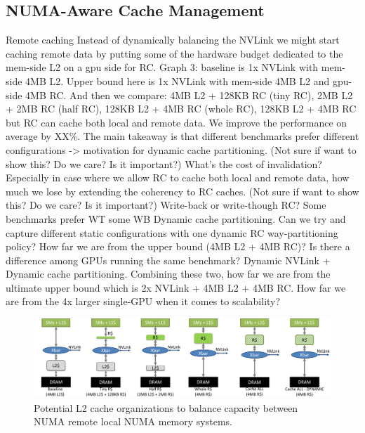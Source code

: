 \subsection{NUMA-Aware Cache Management}
\label{caching}
Remote caching
Instead of dynamically balancing the NVLink we might start caching remote data 
by putting some of the hardware budget dedicated to the mem-side L2 on a gpu 
side for RC. 
Graph 3: baseline is 1x NVLink with mem-side 4MB L2. Upper bound here is 1x 
NVLink with mem-side 4MB L2 and gpu-side 4MB RC. And then we compare: 4MB L2 + 
128KB RC (tiny RC), 2MB L2 + 2MB RC (half RC), 128KB L2 + 4MB RC (whole RC), 
128KB L2 + 4MB RC but RC can cache both local and remote data. We improve the 
performance on average by XX\%. The main takeaway is that different benchmarks 
prefer different configurations -> motivation for dynamic cache partitioning. 
(Not sure if want to show this? Do we care? Is it important?) What’s the cost of 
invalidation? Especially in case where we allow RC to cache both local and 
remote data, how much we lose by extending the coherency to RC caches. 
(Not sure if want to show this? Do we care? Is it important?) Write-back or 
write-though RC? Some benchmarks prefer WT some WB
Dynamic cache partitioning. Can we try and capture different static 
configurations with one dynamic RC way-partitioning policy? How far we are from 
the upper bound (4MB L2 + 4MB RC)? Is there a difference among GPUs running the 
same benchmark? 
Dynamic NVLink + Dynamic cache partitioning. Combining these two, how far we are 
from the ultimate upper bound which is 2x NVLink + 4MB L2 + 4MB RC. How far we 
are from the 4x larger single-GPU when it comes to scalability?

\begin{figure}[t]
    \centering
    \includegraphics[width=1.0\textwidth]{figures/cache_configurations.pdf}
    \caption{Potential L2 cache organizations to balance capacity between NUMA remote
    local NUMA memory systems.}
    \label{fig:cacheorg}
\end{figure}

